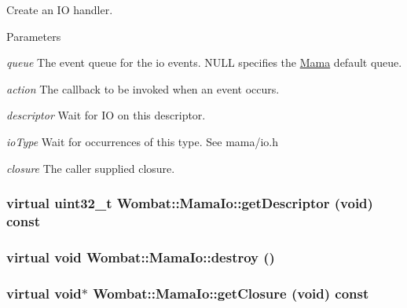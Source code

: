 Create an IO handler. 
\begin{DoxyParams}{Parameters}
\item[{\em queue}]The event queue for the io events. NULL specifies the \hyperlink{classWombat_1_1Mama}{Mama} default queue. \item[{\em action}]The callback to be invoked when an event occurs. \item[{\em descriptor}]Wait for IO on this descriptor. \item[{\em ioType}]Wait for occurrences of this type. See mama/io.h \item[{\em closure}]The caller supplied closure. \end{DoxyParams}
\hypertarget{classWombat_1_1MamaIo_a96c2bdf130a5310e3b71b142046a7d81}{
\subsubsection[{getDescriptor}]{\setlength{\rightskip}{0pt plus 5cm}virtual uint32\_\-t Wombat::MamaIo::getDescriptor (void) const}}
\label{classWombat_1_1MamaIo_a96c2bdf130a5310e3b71b142046a7d81}
\hypertarget{classWombat_1_1MamaIo_aa33749a83f1121376dfac0dc4ae7719c}{
\subsubsection[{destroy}]{\setlength{\rightskip}{0pt plus 5cm}virtual void Wombat::MamaIo::destroy ()}}
\label{classWombat_1_1MamaIo_aa33749a83f1121376dfac0dc4ae7719c}
\hypertarget{classWombat_1_1MamaIo_a34bf1ef81f30d830aa3b000d9fef29fd}{
\subsubsection[{getClosure}]{\setlength{\rightskip}{0pt plus 5cm}virtual void$\ast$ Wombat::MamaIo::getClosure (void) const}}
\label{classWombat_1_1MamaIo_a34bf1ef81f30d830aa3b000d9fef29fd}


